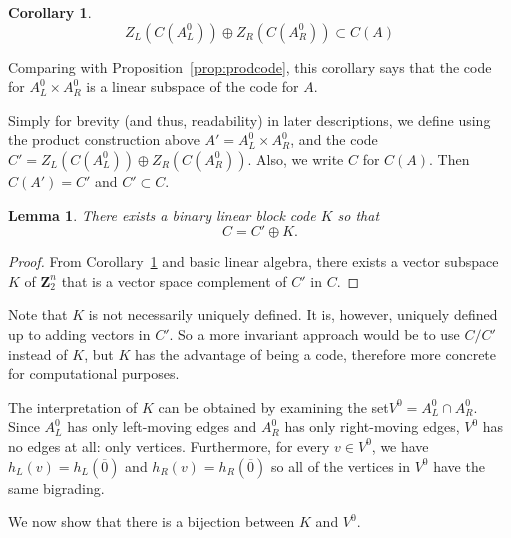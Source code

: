 \documentclass[12pt,twoside,singlespace]{article}
\numberwithin{equation}{section}
\newtheorem{lem}[equation]{Lemma}
\newtheorem{cor}[equation]{Corollary}
\theoremstyle{definition}
\newcommand{\ZZ}{\mathbf{Z}}
\begin{document}
\begin{cor}
\label{cor:cplus}
\[Z_L(C(A_L^0))\oplus Z_R(C(A_R^0))\subset C(A)\]
\end{cor}
Comparing with Proposition~\ref{prop:prodcode}, this corollary says that the code for $A_L^0\times A_R^0$ is a linear subspace of the code for $A$.

Simply for brevity (and thus, readability) in later descriptions, we define using the product construction above $A'=A_L^0\times A_R^0$, and the code $C'=Z_L(C(A_L^0))\oplus Z_R(C(A_R^0))$.  Also, we write $C$ for $C(A)$.  Then $C(A')=C'$ and $C'\subset C$.

\begin{lem}
\label{lem:existk}
There exists a binary linear block code $K$ so that
\[C=C' \oplus K.
\]
\end{lem}
\begin{proof}
From Corollary~\ref{cor:cplus} and basic linear algebra, there exists a vector subspace $K$ of $\ZZ_2^n$ that is a vector space complement of
$C'$ in $C$.
\end{proof}
Note that $K$ is not necessarily uniquely defined.  It is, however, uniquely defined up to adding vectors in $C'$.  So a more invariant approach would be to use $C/C'$ instead of $K$, but $K$ has the advantage of being a code, therefore more concrete for computational purposes.



The interpretation of $K$ can be obtained by examining the set$V^0=A_L^0\cap A_R^0$.  Since $A_L^0$ has only left-moving edges and $A_R^0$ has only right-moving edges, $V^0$ has no edges at all: only vertices.  Furthermore, for every $v\in V^0$, we have $h_L(v)=h_L(\overline{0})$ and $h_R(v)=h_R(\overline{0})$ so all of the vertices in $V^0$ have the same bigrading.

We now show that there is a bijection between $K$ and $V^0$.
\end{document}
